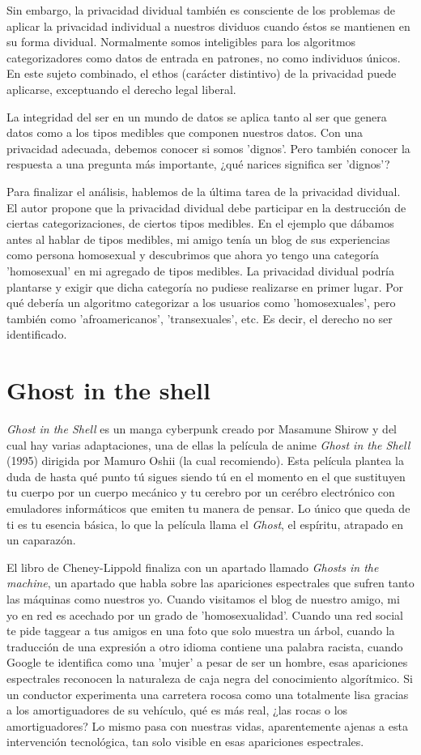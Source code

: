 \documentclass[11pt]{article}
\begin{document}
Sin embargo, la privacidad dividual también es consciente de los problemas de aplicar la privacidad individual a nuestros dividuos cuando éstos se mantienen en su forma dividual. Normalmente somos inteligibles para los algoritmos categorizadores como datos de entrada en patrones, no como individuos únicos. En este sujeto combinado, el ethos (carácter distintivo) de la privacidad puede aplicarse, exceptuando el derecho legal liberal.

La integridad del ser en un mundo de datos se aplica tanto al ser que genera datos como a los tipos medibles que componen nuestros datos. Con una privacidad adecuada, debemos conocer si somos 'dignos'. Pero también conocer la respuesta a una pregunta más importante, ¿qué narices significa ser 'dignos'?

Para finalizar el análisis, hablemos de la última tarea de la privacidad dividual. El autor propone que la privacidad dividual debe participar en la destrucción de ciertas categorizaciones, de ciertos tipos medibles. En el ejemplo que dábamos antes al hablar de tipos medibles, mi amigo tenía un blog de sus experiencias como persona homosexual y descubrimos que ahora yo tengo una categoría 'homosexual' en mi agregado de tipos medibles. La privacidad dividual podría plantarse y exigir que dicha categoría no pudiese realizarse en primer lugar. Por qué debería un algoritmo categorizar a los usuarios como 'homosexuales', pero también como 'afroamericanos', 'transexuales', etc. Es decir, el derecho no ser identificado.
\section{Ghost in the shell}
\textit{Ghost in the Shell} es un manga cyberpunk creado por Masamune Shirow y del cual hay varias adaptaciones, una de ellas la película de anime \textit{Ghost in the Shell} (1995) dirigida por Mamuro Oshii (la cual recomiendo). Esta película plantea la duda de hasta qué punto tú sigues siendo tú en el momento en el que sustituyen tu cuerpo por un cuerpo mecánico y tu cerebro por un cerébro electrónico con emuladores informáticos que emiten tu manera de pensar. Lo único que queda de ti es tu esencia básica, lo que la película llama el \textit{Ghost}, el espíritu, atrapado en un caparazón.

El libro de Cheney-Lippold finaliza con un apartado llamado \textit{Ghosts in the machine}, un apartado que habla sobre las apariciones espectrales que sufren tanto las máquinas como nuestros yo. Cuando visitamos el blog de nuestro amigo, mi yo en red es acechado por un grado de 'homosexualidad'. Cuando una red social te pide taggear a tus amigos en una foto que solo muestra un árbol, cuando la traducción de una expresión a otro idioma contiene una palabra racista, cuando Google te identifica como una 'mujer' a pesar de ser un hombre, esas apariciones espectrales reconocen la naturaleza de caja negra del conocimiento algorítmico. Si un conductor experimenta una carretera rocosa como una totalmente lisa gracias a los amortiguadores de su vehículo, qué es más real, ¿las rocas o los amortiguadores? Lo mismo pasa con nuestras vidas, aparentemente ajenas a esta intervención tecnológica, tan solo visible en esas apariciones espectrales.
\end{document}
